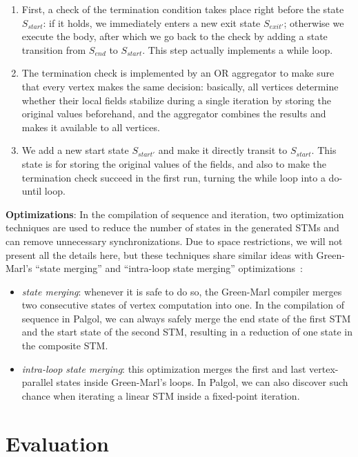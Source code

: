 \documentclass{sokendai_thesis} %
\begin{document}
\begin{enumerate}
 \item 
  First, a check of the termination condition takes place right before the state $S_\mathit{start}$: if it holds, we immediately enters a new exit state $S_\mathit{exit'}$; otherwise we execute the body, after which we go back to the check by adding a state transition from $S_\mathit{end}$ to $S_\mathit{start}$.
  This step actually implements a while loop.
 \item
  The termination check is implemented by an OR aggregator to make sure that every vertex makes the same decision:
  basically, all vertices determine whether their local fields stabilize during a single iteration by storing the original values beforehand, and the aggregator combines the results and makes it available to all vertices.
 \item
  We add a new start state $S_\mathit{start'}$ and make it directly transit to $S_\mathit{start}$.
  This state is for storing the original values of the fields, and also to make the termination check succeed in the first run, turning the while loop into a do-until loop.
\end{enumerate}

\textbf{Optimizations}:
In the compilation of sequence and iteration, two optimization techniques are used to reduce the number of states in the generated STMs and can remove unnecessary synchronizations.
Due to space restrictions, we will not present all the details here, but these techniques share similar ideas with Green-Marl's ``state merging'' and ``intra-loop state merging'' optimizations~\cite{green14}:
\begin{itemize}
 \item \emph{state merging}:
  whenever it is safe to do so, the Green-Marl compiler merges two consecutive states of vertex computation into one.
  In the compilation of sequence in Palgol, we can always safely merge the end state of the first STM and the start state of the second STM, resulting in a reduction of one state in the composite STM.
 \item \emph{intra-loop state merging}:
  this optimization merges the first and last vertex-parallel states inside Green-Marl's loops.
  In Palgol, we can also discover such chance when iterating a linear STM inside a fixed-point iteration.
\end{itemize}

\section{Evaluation}
\end{document}
